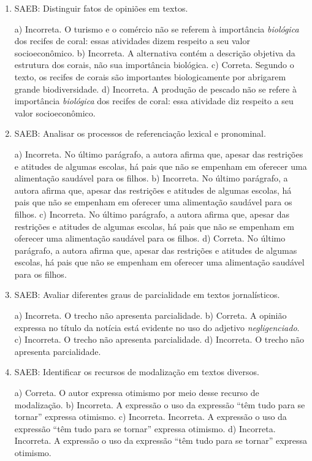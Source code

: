 \begin{enumerate}
	\item
SAEB: Distinguir fatos de opiniões em textos.

a) Incorreta. O turismo e o comércio não se referem à importância 
\textit{biológica} dos recifes de coral: essas atividades dizem respeito a
seu valor socioeconômico.
b) Incorreta. A alternativa contém a descrição objetiva da estrutura dos
corais, não sua importância biológica.
c) Correta. Segundo o texto, os recifes de corais são importantes
biologicamente por abrigarem grande biodiversidade.
d) Incorreta. A produção de pescado não se refere à importância 
\textit{biológica} dos recifes de coral: essa atividade diz respeito
a seu valor socioeconômico.

	\item
SAEB: Analisar os processos de referenciação lexical e pronominal.

a) Incorreta. No último parágrafo, a autora afirma que, apesar das restrições
e atitudes de algumas escolas, há pais que não se empenham em oferecer uma alimentação saudável para os filhos.
b) Incorreta. No último parágrafo, a autora afirma que, apesar das restrições
e atitudes de algumas escolas, há pais que não se empenham em oferecer uma alimentação saudável para os filhos.
c) Incorreta. No último parágrafo, a autora afirma que, apesar das restrições
e atitudes de algumas escolas, há pais que não se empenham em oferecer uma alimentação saudável para os filhos.
d) Correta. No último parágrafo, a autora afirma que, apesar das restrições
e atitudes de algumas escolas, há pais que não se empenham em oferecer uma alimentação saudável para os filhos.
	
	\item
SAEB: Avaliar diferentes graus de parcialidade em textos jornalísticos.

a) Incorreta. O trecho não apresenta parcialidade.
b) Correta. A opinião expressa no título da notícia está evidente 
no uso do adjetivo \textit{negligenciado}.
c) Incorreta. O trecho não apresenta parcialidade.
d) Incorreta. O trecho não apresenta parcialidade.

	\item
SAEB: Identificar os recursos de modalização em textos diversos.

a) Correta. O autor expressa otimismo por meio desse recurso de modalização.
b) Incorreta. A expressão o uso da expressão ``têm tudo para se
tornar'' expressa otimismo.
c) Incorreta.  Incorreta. A expressão o uso da expressão ``têm tudo para se
tornar'' expressa otimismo.
d) Incorreta. Incorreta. A expressão o uso da expressão ``têm tudo para se
tornar'' expressa otimismo.


\end{enumerate}
